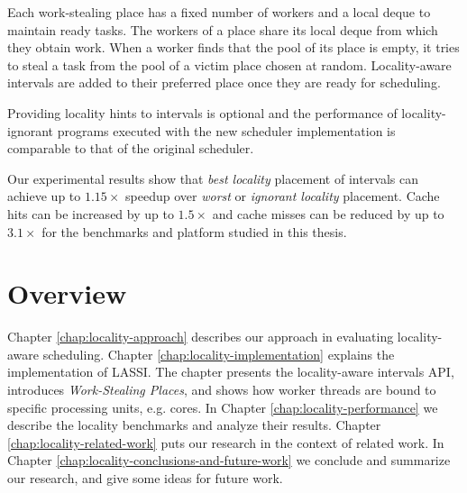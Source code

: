 Each work-stealing place has a fixed number of workers and a local
deque to maintain ready tasks. The workers of a place share its local
deque from which they obtain work. When a worker finds that the pool
of its place is empty, it tries to steal a task from the pool of a
victim place chosen at random. Locality-aware intervals are added to
their preferred place once they are ready for scheduling.

Providing locality hints to intervals is optional and the performance
of locality-ignorant programs executed with the new scheduler
implementation is comparable to that of the original scheduler.

Our experimental results show that \emph{best locality} placement of
intervals can achieve up to $1.15\times$ speedup over \emph{worst} or
\emph{ignorant locality} placement. Cache hits can be increased by up
to $1.5\times$ and cache misses can be reduced by up to $3.1\times$
for the benchmarks and platform studied in this thesis.



\section{Overview}
\label{sec:locality-introduction-locality-overview}

Chapter \ref{chap:locality-approach} describes our approach in
evaluating locality-aware scheduling. Chapter
\ref{chap:locality-implementation} explains the implementation of
LASSI. The chapter presents the locality-aware intervals API,
introduces \emph{Work-Stealing Places}, and shows how worker threads
are bound to specific processing units, e.g. cores.  In Chapter
\ref{chap:locality-performance} we describe the locality benchmarks
and analyze their results. Chapter \ref{chap:locality-related-work}
puts our research in the context of related work. In Chapter
\ref{chap:locality-conclusions-and-future-work} we conclude and
summarize our research, and give some ideas for future work.



